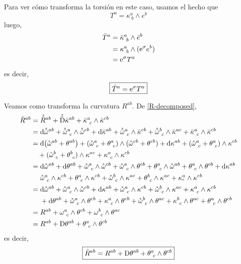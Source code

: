 Para ver cómo transforma la torsión en este caso, usamos el hecho que
\begin{equation}
  T^{a}=\kappa^{a}_{~b}\wedge e^b
\end{equation}
luego,
\begin{align}
  \bar{T}^{a}&=\bar{\kappa}^{a}_{~b}\wedge\bar{e}^b\\
  &=\kappa^{a}_{~b}\wedge (\mathrm{e}^\sigma e^b)\\
  &=\mathrm{e}^\sigma T^{a}
\end{align}
es decir,
\begin{equation}
 \boxed{\bar{T}^{a} =\mathrm{e}^\sigma T^{a}}
\end{equation}

Veamos como transforma la curvatura $R^{ab}$. De \eqref{R-decomposed},
\begin{align}
	\bar{R}^{ab}&=\mathring{\bar{R}}^{ab}+\mathring{\bar{\mathrm{D}}}\bar{\kappa}^{ab}+\bar{\kappa}^{a}_{~c}\wedge \bar{\kappa}^{cb}\\
	&=\dd\mathring{\bar{\omega}}^{ab}+\mathring{\bar{\omega}}^{a}_{~c}\wedge\mathring{\bar{\omega}}^{cb}+\dd\bar{\kappa}^{ab}+\mathring{\bar{\omega}}^{a}_{~c}\wedge \bar{\kappa}^{cb}+\mathring{\bar{\omega}}^{b}_{~c}\wedge \bar{\kappa}^{ac}+\bar{\kappa}^{a}_{~c}\wedge\bar{\kappa}^{cb}\\
	&=\dd(\mathring{\omega}^{ab}+\theta^{ab})+(\mathring{\omega}^{a}_{~c}+\theta^{a}_{~c})\wedge (\mathring{\omega}^{cb}+\theta^{cb})+\dd \kappa^{ab}+(\mathring{\omega}^{a}_{~c}+\theta^{a}_{~c})\wedge \kappa^{cb}\\&~~~+(\mathring{\omega}^b_{~c}+\theta^b_{~c})\wedge \kappa^{ac}+\kappa^{a}_{~c}\wedge\kappa^{cb}\\
	&=\dd\mathring{\omega}^{ab}+\dd\theta^{ab}+\mathring{\omega}^{a}_{~c}\wedge\mathring{\omega}^{cb}+\mathring{\omega}^{a}_{~c}\wedge \theta^{cb}+\theta^{a}_{~c}\wedge \mathring{\omega}^{ab}+\theta^{a}_{~c}\wedge \theta^{cb}+\dd\kappa^{ab}\\&~~~~ \mathring{\omega}^{a}_{~c}\wedge\kappa^{cb}+\theta^{a}_{~c}\wedge\kappa^{cb}+\mathring{\omega}^b_{~c}\wedge\kappa^{ac}+\theta^b_{~c}\wedge\kappa^{ac}+\kappa^{a}_{^c}\wedge\kappa^{cb}\\
	&=\dd\mathring{\omega}^{ab}+\mathring{\omega}^{a}_{~c}\wedge\mathring{\omega}^{cb}+\dd\kappa^{ab}+\mathring{\omega}^{a}_{~c}\wedge\kappa^{cb}+\mathring{\omega}^b_{~c}\wedge\kappa^{ac}+\kappa^{a}_{~c}\wedge\kappa^{cb}\\&~~~~
	+\dd\theta^{ab}+\mathring{\omega}^{a}_{~c}\wedge \theta^{cb}+\kappa^{a}_{~c}\wedge \theta^{cb}+\mathring{\omega}^b_{~c}\wedge\theta^{ac}+\kappa^b_{~c}\wedge\theta^{ac}+\theta^{a}_{~c}\wedge\theta^{cb}\\
	&=R^{ab}+\omega^{a}_{~c}\wedge \theta^{cb}+\omega^b_{~c}\wedge\theta^{ac}\\
	&=R^{ab}+\mathrm{D}\theta^{ab}+\theta^{a}_{~c}\wedge\theta^{cb}
\end{align}
es decir,
\begin{equation}
  \boxed{\bar{R}^{ab}=R^{ab}+\mathrm{D}\theta^{ab}+\theta^{a}_{~c}\wedge\theta^{cb}}
\end{equation}

